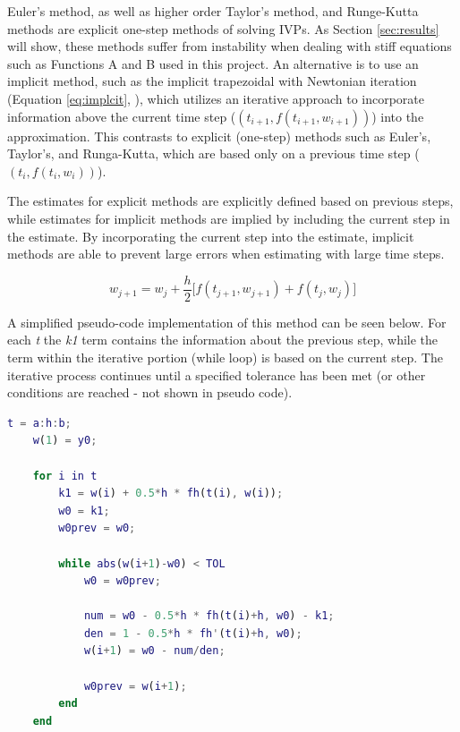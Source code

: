 \documentclass{article}
\begin{document}
Euler's method, as well as higher order Taylor's method, and Runge-Kutta methods are explicit one-step methods of solving IVPs. As Section \ref{sec:results} will show, these methods suffer from instability when dealing with stiff equations such as Functions A and B used in this project. An alternative is to use an implicit method, such as the implicit trapezoidal with Newtonian iteration (Equation \ref{eq:implcit}, \citep{burden2010}), which utilizes an iterative approach to incorporate information above the current time step ($(t_{i+1}, f(t_{i+1}, w_{i+1}))$) into the approximation. This contrasts to explicit (one-step) methods such as Euler's, Taylor's, and Runga-Kutta, which are based only on a previous time step ($(t_{i}, f(t_{i}, w_{i}))$). 

The estimates for explicit methods are explicitly defined based on previous steps, while estimates for implicit methods are implied by including the current step in the estimate. By incorporating the current step into the estimate, implicit methods are able to prevent large errors when estimating with large time steps.

\begin{center}
	\begin{equation}
	w_{j+1} = w_j + \frac{h}{2} \big[ f(t_{j+1}, w_{j+1}) + f(t_{j}, w_{j}) \big]
	\label{eq:implcit}
	\end{equation}
\end{center}

A simplified pseudo-code implementation of this method can be seen below. For each \textit{t} the \textit{k1} term contains the information about the previous step, while the term within the iterative portion (while loop) is based on the current step. The iterative process continues until a specified tolerance has been met (or other conditions are reached - not shown in pseudo code).

\bigskip
\begin{center}
\footnotesize
\begin{lstlisting}[language=Matlab]
    t = a:h:b;
    w(1) = y0;

    for i in t
        k1 = w(i) + 0.5*h * fh(t(i), w(i));
        w0 = k1;
        w0prev = w0;

        while abs(w(i+1)-w0) < TOL
            w0 = w0prev;

            num = w0 - 0.5*h * fh(t(i)+h, w0) - k1;
            den = 1 - 0.5*h * fh'(t(i)+h, w0);
            w(i+1) = w0 - num/den;

            w0prev = w(i+1);
        end    
    end
\end{lstlisting}
\end{center}
\bigskip
\end{document}
